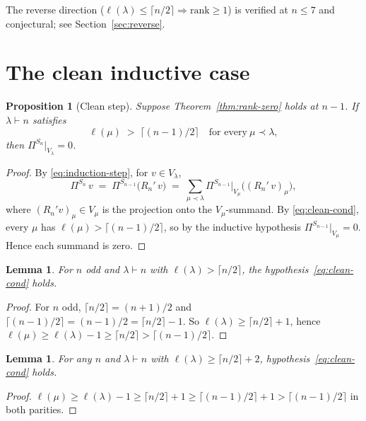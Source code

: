 \documentclass[11pt]{article}
\newtheorem{lemma}[theorem]{Lemma}
\newtheorem{proposition}[theorem]{Proposition}
\theoremstyle{definition}
\begin{document}
The reverse direction
($\ell(\lambda)\le\lceil n/2\rceil \Rightarrow \mathrm{rank}\ge 1$)
is verified at $n\le 7$ and conjectural; see Section~\ref{sec:reverse}.

\section{The clean inductive case}\label{sec:clean}

\begin{proposition}[Clean step]\label{prop:clean}
Suppose Theorem~\ref{thm:rank-zero} holds at $n{-}1$. If
$\lambda\vdash n$ satisfies
\begin{equation}\label{eq:clean-cond}
   \ell(\mu) \;>\; \big\lceil (n-1)/2\big\rceil
   \quad\text{for every}\ \mu \prec \lambda,
\end{equation}
then $\Pi^{S_n}|_{V_\lambda}=0$.
\end{proposition}

\begin{proof}
By \eqref{eq:induction-step}, for $v\in V_\lambda$,
\[
   \Pi^{S_n}\,v \;=\; \Pi^{S_{n-1}}\bigl(R_n'\,v\bigr)
   \;=\; \sum_{\mu\prec\lambda}
         \Pi^{S_{n-1}}\!\big|_{V_\mu}\bigl((R_n'\,v)_\mu\bigr),
\]
where $(R_n'v)_\mu\in V_\mu$ is the projection onto the
$V_\mu$-summand. By \eqref{eq:clean-cond}, every $\mu$ has
$\ell(\mu)>\lceil(n-1)/2\rceil$, so by the inductive hypothesis
$\Pi^{S_{n-1}}|_{V_\mu}=0$. Hence each summand is zero.
\end{proof}

\begin{lemma}\label{lem:n-odd-clean}
For $n$ odd and $\lambda\vdash n$ with $\ell(\lambda)>\lceil n/2\rceil$,
the hypothesis~\eqref{eq:clean-cond} holds.
\end{lemma}

\begin{proof}
For $n$ odd, $\lceil n/2\rceil = (n{+}1)/2$ and
$\lceil(n-1)/2\rceil = (n{-}1)/2 = \lceil n/2\rceil - 1$. So
$\ell(\lambda)\ge \lceil n/2\rceil + 1$, hence
$\ell(\mu)\ge \ell(\lambda)-1\ge \lceil n/2\rceil > \lceil(n-1)/2\rceil$.
\end{proof}

\begin{lemma}\label{lem:deep-regime}
For \emph{any} $n$ and $\lambda\vdash n$ with
$\ell(\lambda)\ge \lceil n/2\rceil + 2$, hypothesis~\eqref{eq:clean-cond} holds.
\end{lemma}

\begin{proof}
$\ell(\mu)\ge \ell(\lambda)-1\ge \lceil n/2\rceil + 1
\ge \lceil(n-1)/2\rceil + 1 > \lceil(n-1)/2\rceil$ in both parities.
\end{proof}
\end{document}
